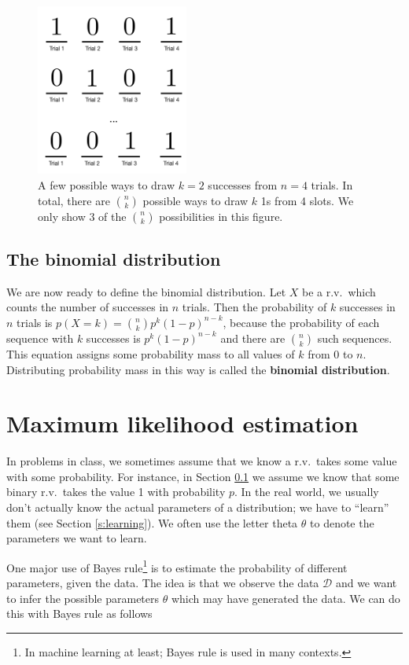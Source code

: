 \documentclass[]{article}
\theoremstyle{definition}
\begin{document}
\begin{figure}[!ht]
     \centering
     \includegraphics[width=5cm]{binomial_slots.pdf}
     \caption{A few possible ways to draw $k=2$ successes from $n=4$ trials. In total, there are $n \choose k$ possible ways to draw $k$ 1s from 4 slots. We only show 3 of the $n \choose k$ possibilities in this figure.}\label{f:binomial_slots}
\end{figure}

\subsection{The binomial distribution}\label{s:binomial}

We are now ready to define the binomial distribution. Let $X$ be a r.v.\ which counts the number of successes in $n$ trials. Then the probability of $k$ successes in $n$ trials is $ p(X=k) = {n \choose k} p^k (1-p)^{n-k}$, because the probability of each sequence with $k$ successes is $p^k (1-p)^{n-k}$ and there are $ {n \choose k}$ such sequences. This equation assigns some probability mass to all values of $k$ from 0 to $n$. Distributing probability mass in this way is called the \textbf{binomial distribution}.

\section{Maximum likelihood estimation} 

In problems in class, we sometimes assume that we know a r.v.\ takes some value with some probability. For instance, in Section \ref{s:binomial} we assume we know that some binary r.v.\ takes the value 1 with probability $p$. In the real world, we usually don't actually know the actual parameters of a distribution; we have to ``learn'' them (see Section \ref{s:learning}). We often use the letter theta $\theta$ to denote the parameters we want to learn. 

One major use of Bayes rule\footnote{In machine learning at least; Bayes rule is used in many contexts.} is to estimate the probability of different parameters, given the data. The idea is that we observe the data $\mathcal{D}$ and we want to infer the possible parameters $ \theta$ which may have generated the data. We can do this with Bayes rule as follows
\end{document}
